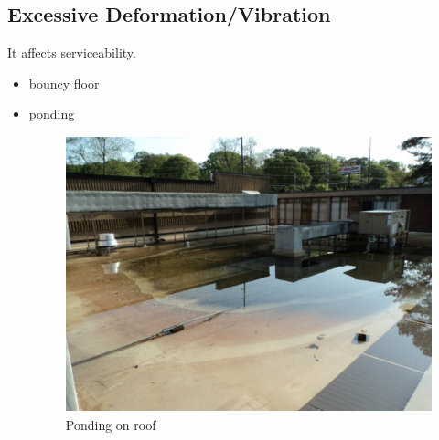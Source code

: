 \subsection{Excessive Deformation/Vibration}
It affects serviceability.
\begin{itemize}
\item bouncy floor
\item ponding
\begin{figure}[H]
\centering\includegraphics[height=8cm]{PIC/CH02/PONDING}
\caption{Ponding on roof}
\end{figure}
\end{itemize}
